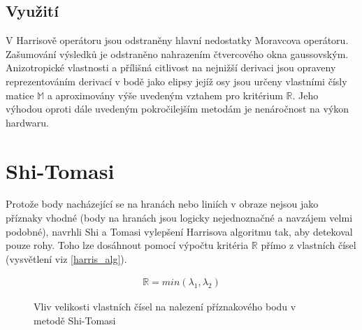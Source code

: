 \subsection{Využití}
V Harrisově operátoru jsou odstraněny hlavní nedostatky Moravcova operátoru. Zašumování výsledků je odstraněno nahrazením čtvercového okna gaussovským. Anizotropické vlastnosti a přílišná citlivost na nejnižší derivaci jsou opraveny reprezentováním derivací v bodě jako elipsy jejíž osy jsou určeny vlastními čísly matice $\mathbb{M}$ a aproximovány výše uvedeným vztahem pro kritérium $\mathbb{R}$. Jeho výhodou oproti dále uvedeným pokročilejším metodám je nenáročnost na výkon hardwaru.

\section{Shi-Tomasi}

	Protože body nacházející se na hranách nebo liniích v obraze nejsou jako příznaky vhodné (body na hranách jsou logicky nejednoznačné a navzájem velmi podobné), navrhli Shi a Tomasi \cite{shi1994good} vylepšení Harrisova algoritmu tak, aby detekoval pouze rohy. Toho lze dosáhnout pomocí výpočtu kritéria $\mathbb{R}$ přímo z vlastních čísel (vysvětlení viz \ref{harris_alg}). 
	
	\begin{align}
	\mathbb{R} = min(\lambda_1, \lambda_2)
	\end{align}
	
	\begin{figure}
	\caption{\protect Vliv velikosti vlastních čísel na nalezení příznakového bodu v metodě Shi-Tomasi}\label{ST_eigen}
	\end{figure}
	
